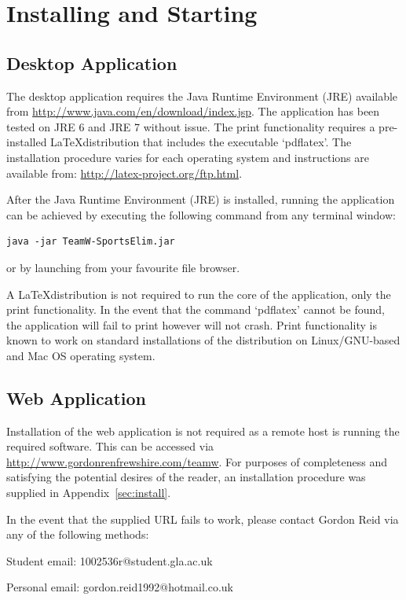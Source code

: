 \section{Installing and Starting}

\subsection{Desktop Application}

The desktop application requires the Java Runtime Environment (JRE) available
from \url{http://www.java.com/en/download/index.jsp}. The application has been
tested on JRE 6 and JRE 7 without issue. The print functionality
requires a pre-installed \LaTeX distribution that includes the
executable `pdflatex'. The installation procedure varies for each
operating system and instructions are available from:
\url{http://latex-project.org/ftp.html}.

After the Java Runtime Environment (JRE) is installed, running the application
can be achieved by executing the following command from any terminal
window:
\begin{verbatim}
java -jar TeamW-SportsElim.jar
\end{verbatim}
or by launching from your favourite file browser.

A \LaTeX  distribution is not required to run the core of the
application, only the print functionality. In the event that the
command `pdflatex' cannot be found, the application will fail to print
however will not crash. Print functionality is known to work on
standard installations of the distribution on Linux/GNU-based and Mac
OS operating system.

\subsection{Web Application}
\label{sec:WEBAPP}
Installation of the web application is not required as a remote host is running
the required software. This can be accessed via
\url{http://www.gordonrenfrewshire.com/teamw}. For purposes of completeness and
satisfying the potential desires of the reader, an installation procedure was
supplied in Appendix~\ref{sec:install}.

In the event that the supplied URL fails to work, please contact Gordon Reid via
any of the following methods:

Student email: 1002536r@student.gla.ac.uk

Personal email: gordon.reid1992@hotmail.co.uk

